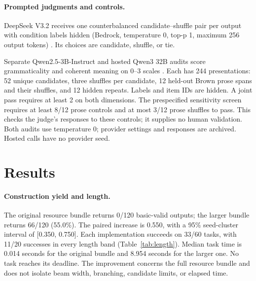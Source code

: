 \documentclass[11pt]{article}
\begin{document}
\paragraph{Prompted judgments and controls.}
DeepSeek V3.2 receives one counterbalanced candidate--shuffle pair per output with condition labels hidden (Bedrock, temperature 0, top-p 1, maximum 256 output tokens) \citep{awsbedrockdeepseekv32}. Its choices are candidate, shuffle, or tie.

Separate Qwen2.5-3B-Instruct and hosted Qwen3 32B audits score grammaticality and coherent meaning on 0--3 scales \citep{qwen25,awsbedrockqwen332b}. Each has 244 presentations: 52 unique candidates, three shuffles per candidate, 12 held-out Brown prose spans and their shuffles, and 12 hidden repeats. Labels and item IDs are hidden. A joint pass requires at least 2 on both dimensions. The prespecified sensitivity screen requires at least 8/12 prose controls and at most 3/12 prose shuffles to pass. This checks the judge's responses to these controls; it supplies no human validation. Both audits use temperature 0; provider settings and responses are archived. Hosted calls have no provider seed.

\section{Results}

\paragraph{Construction yield and length.}
The original resource bundle returns 0/120 basic-valid outputs; the larger bundle returns 66/120 (55.0\%). The paired increase is 0.550, with a 95\% seed-cluster interval of [0.350, 0.750]. Each implementation succeeds on 33/60 tasks, with 11/20 successes in every length band (Table~\ref{tab:length}). Median task time is 0.014 seconds for the original bundle and 8.954 seconds for the larger one. No task reaches its deadline. The improvement concerns the full resource bundle and does not isolate beam width, branching, candidate limits, or elapsed time.
\end{document}
